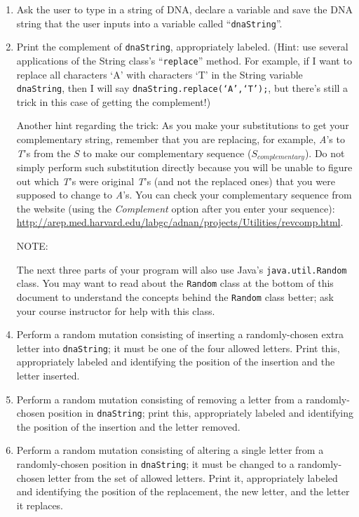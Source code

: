 \begin{enumerate}
\item
Ask the user to type in a string of DNA, declare a variable and save the DNA string that the user inputs into a variable called ``{\tt dnaString}''.

\item Print the complement of {\tt dnaString}, appropriately labeled.  (Hint: use several applications of the String
  class's ``{\tt replace}'' method. For example, if I want to replace all characters `A' with characters `T' in the
  String variable {\tt dnaString}, then I will say {\tt dnaString.replace(`A',`T');}, but there's still a trick in this
  case of getting the complement!)

Another hint regarding the trick: As you make your substitutions to get your complementary string, remember that you are
replacing, for example, \emph{A}'s to \emph{T}'s from the $S$ to make our complementary sequence ($S_{complementary}$).
Do not simply perform such substitution directly because you will be unable to figure out which \emph{T}'s were original
\emph{T}'s (and not the replaced ones) that you were supposed to change to \emph{A}'s. You can check your complementary
sequence from the website  (using the \emph{Complement} option after you enter your sequence): \url{http://arep.med.harvard.edu/labgc/adnan/projects/Utilities/revcomp.html}.

\item[NOTE:]

The next three parts of your program will also use Java's {\tt java.util.Random} class. You may want to read about the
{\tt Random} class at the bottom of this document to understand the concepts behind the {\tt Random} class better; ask
your course instructor for help with this class.

\item
Perform a random mutation consisting of inserting a randomly-chosen
extra letter into {\tt dnaString}; it
must be one of the four allowed letters. Print this, appropriately labeled
and identifying the position of the insertion and the letter inserted.
\item
Perform a random mutation consisting of removing a letter from a
randomly-chosen position in {\tt dnaString}; print this, appropriately labeled
and identifying the position of the insertion and the letter removed.
\item
Perform a random mutation consisting of altering a single letter from a
randomly-chosen position in {\tt dnaString}; it must be changed to a
randomly-chosen letter from the set of allowed letters. Print it, appropriately
labeled
and identifying the position of the replacement, the new letter, and the
letter it replaces.
\end{enumerate}

